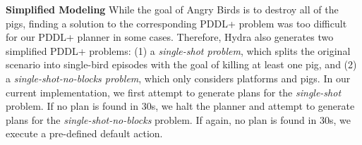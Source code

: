\documentclass[letterpaper]{article} %
\begin{document}


\noindent\textbf{Simplified Modeling} While the goal of Angry Birds is to destroy all of the pigs, finding a solution to the corresponding PDDL+ problem was too difficult for our PDDL+ planner in some cases.
Therefore, Hydra also generates two simplified PDDL+ problems:
(1) a \textit{single-shot problem}, which splits the original scenario into single-bird episodes with the goal of killing at least one pig, and (2) a \textit{single-shot-no-blocks problem}, which only considers platforms and pigs. In our current implementation, we first attempt to generate plans for the \textit{single-shot} problem.
If no plan is found in 30s, we halt the planner and attempt to generate plans for the \textit{single-shot-no-blocks} problem.
If again, no plan is found in 30s, we execute a pre-defined default action.
\end{document}
